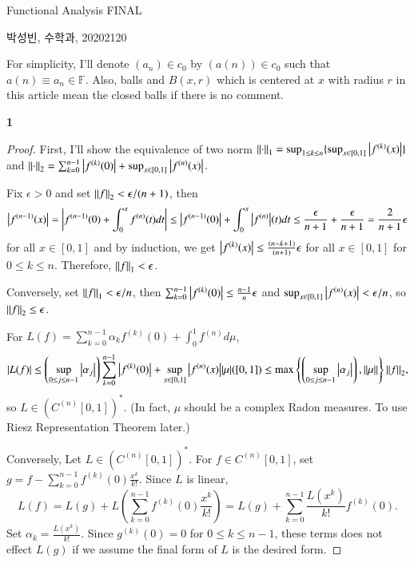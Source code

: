 \documentclass[a4paper, 12pt]{article}
\theoremstyle{Mydefinition}
\theoremstyle{Mytheorem}
\begin{document}
\thispagestyle{myfirstpage}
\begin{center}
	\Large{Functional Analysis FINAL}
\end{center}
박성빈, 수학과, 20202120

For simplicity, I'll denote $(a_n)\in c_0$ by $(a(n))\in c_0$ such that $a(n) \equiv a_n\in \mathbb{F}$. Also, balls and $B(x,r)$ which is centered at $x$ with radius $r$ in this article mean the closed balls if there is no comment.

\noindent \textbf{1}
\begin{proof}
First, I'll show the equivalence of two norm $\norm{\cdot}_1 = \sup_{1\leq k\leq n}\{\sup_{x\in[0,1]}\abs{f^{(k)}(x)}\}$ and $\norm{\cdot}_2 = \sum_{k=0}^{n-1}\abs{f^{(k)}(0)} + \sup_{x\in[0,1]}\abs{f^{(n)}(x)}$.

Fix $\epsilon>0$ and set $\norm{f}_2<\epsilon/(n+1)$, then
\begin{equation}\label{Eq:1}
    \abs{f^{(n-1)}(x)} = \abs{f^{(n-1)}(0) + \int_0^x f^{(n)}(t)dt} \leq \abs{f^{(n-1)}(0)} + \int_0^x \abs{f^{(n)}}(t)dt \leq \frac{\epsilon}{n+1} + \frac{\epsilon}{n+1} = \frac{2}{n+1}\epsilon
\end{equation}
for all $x\in [0,1]$ and by induction, we get $\abs{f^{(k)}(x)}\leq \frac{(n-k+1)}{(n+1)}\epsilon$ for all $x\in [0,1]$ for $0\leq k\leq n$. Therefore, $\norm{f}_1<\epsilon$.

Conversely, set $\norm{f}_1<\epsilon/n$, then $\sum_{k=0}^{n-1}\abs{f^{(k)}(0)}\leq \frac{n-1}{n}\epsilon$ and $\sup_{x\in[0,1]}\abs{f^{(n)}(x)}<\epsilon/n$, so $\norm{f}_2\leq \epsilon$.

For $L(f) = \sum_{k=0}^{n-1}\alpha_k f^{(k)}(0) + \int_0^1 f^{(n)}d\mu$, 
\begin{equation}\label{Eq:norm1}
    \abs{L(f)}\leq \left(\sup_{0\leq j\leq n-1}\abs{\alpha_j}\right)\sum_{k=0}^{n-1}\abs{f^{(k)}(0)} + \sup_{x\in [0,1]}\abs{f^{(n)}(x)}\abs{\mu}([0,1])\leq \max \left\{\left(\sup_{0\leq j\leq n-1}\abs{\alpha_j}\right), \norm{\mu}\right\}\norm{f}_2,
\end{equation}
so $L\in \left(C^{(n)}[0,1]\right)^*$. (In fact, $\mu$ should be a complex Radon measures. To use Riesz Representation Theorem later.)

Conversely, Let $L\in \left(C^{(n)}[0,1]\right)^*$. For $f\in C^{(n)}[0,1]$, set $g = f-\sum_{k=0}^{n-1}f^{(k)}(0)\frac{x^k}{k!}$. Since $L$ is linear,
\begin{equation}
    L(f) = L(g) + L\left(\sum_{k=0}^{n-1}f^{(k)}(0)\frac{x^k}{k!}\right) = L(g) + \sum_{k=0}^{n-1}\frac{L(x^k)}{k!}f^{(k)}(0).
\end{equation}
Set $\alpha_k = \frac{L(x^k)}{k!}$. Since $g^{(k)}(0) = 0 $ for $0\leq k \leq n-1$, these terms does not effect $L(g)$ if we assume the final form of $L$ is the desired form.


\end{proof}
\end{document}
